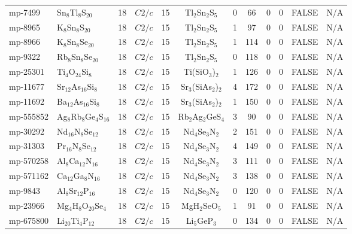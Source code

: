 {\begin{longtable}{llcccccccccc}
    mp-7499 & Sn$_{8}$Tl$_{8}$S$_{20}$ & 18    & $C2/c$ & 15    & Tl$_{2}$Sn$_{2}$S$_{5}$ & 0     & 66    & 0     & 0     & FALSE & N/A \\
    mp-8965 & K$_{8}$Sn$_{8}$S$_{20}$ & 18    & $C2/c$ & 15    & Tl$_{2}$Sn$_{2}$S$_{5}$ & 1     & 97    & 0     & 0     & FALSE & N/A \\
    mp-8966 & K$_{8}$Sn$_{8}$Se$_{20}$ & 18    & $C2/c$ & 15    & Tl$_{2}$Sn$_{2}$S$_{5}$ & 1     & 114   & 0     & 0     & FALSE & N/A \\
    mp-9322 & Rb$_{8}$Sn$_{8}$Se$_{20}$ & 18    & $C2/c$ & 15    & Tl$_{2}$Sn$_{2}$S$_{5}$ & 0     & 118   & 0     & 0     & FALSE & N/A \\
    mp-25301 & Ti$_{4}$O$_{24}$Si$_{8}$ & 18    & $C2/c$ & 15    & Ti(SiO$_{3}$)$_{2}$ & 1     & 126   & 0     & 0     & FALSE & N/A \\
    mp-11677 & Sr$_{12}$As$_{16}$Si$_{8}$ & 18    & $C2/c$ & 15    & Sr$_{3}$(SiAs$_{2}$)$_{2}$ & 4     & 172   & 0     & 0     & FALSE & N/A \\
    mp-11692 & Ba$_{12}$As$_{16}$Si$_{8}$ & 18    & $C2/c$ & 15    & Sr$_{3}$(SiAs$_{2}$)$_{2}$ & 1     & 150   & 0     & 0     & FALSE & N/A \\
    mp-555852 & Ag$_{8}$Rb$_{8}$Ge$_{4}$S$_{16}$ & 18    & $C2/c$ & 15    & Rb$_{2}$Ag$_{2}$GeS$_{4}$ & 3     & 90    & 0     & 0     & FALSE & N/A \\
    mp-30292 & Nd$_{16}$N$_{8}$Se$_{12}$ & 18    & $C2/c$ & 15    & Nd$_{4}$Se$_{3}$N$_{2}$ & 2     & 151   & 0     & 0     & FALSE & N/A \\
    mp-31303 & Pr$_{16}$N$_{8}$Se$_{12}$ & 18    & $C2/c$ & 15    & Nd$_{4}$Se$_{3}$N$_{2}$ & 4     & 149   & 0     & 0     & FALSE & N/A \\
    mp-570258 & Al$_{8}$Ca$_{12}$N$_{16}$ & 18    & $C2/c$ & 15    & Nd$_{4}$Se$_{3}$N$_{2}$ & 3     & 111   & 0     & 0     & FALSE & N/A \\
    mp-571162 & Ca$_{12}$Ga$_{8}$N$_{16}$ & 18    & $C2/c$ & 15    & Nd$_{4}$Se$_{3}$N$_{2}$ & 3     & 138   & 0     & 0     & FALSE & N/A \\
    mp-9843 & Al$_{8}$Sr$_{12}$P$_{16}$ & 18    & $C2/c$ & 15    & Nd$_{4}$Se$_{3}$N$_{2}$ & 0     & 120   & 0     & 0     & FALSE & N/A \\
    mp-23966 & Mg$_{4}$H$_{8}$O$_{20}$Se$_{4}$ & 18    & $C2/c$ & 15    & MgH$_{2}$SeO$_{5}$ & 1     & 91    & 0     & 0     & FALSE & N/A \\
    mp-675800 & Li$_{20}$Ti$_{4}$P$_{12}$ & 18    & $C2/c$ & 15    & Li$_{5}$GeP$_{3}$ & 0     & 134   & 0     & 0     & FALSE & N/A \\

\end{longtable}}
